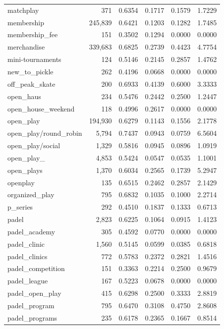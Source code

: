 \begin{table}[htbp]
\begin{tabular}{lrrrrr}
  matchplay & 371 & 0.6354 & 0.1717 & 0.1579 & 1.7229 \\
  membership & 245,839 & 0.6421 & 0.1203 & 0.1282 & 1.7485 \\
  membership\_fee & 151 & 0.3502 & 0.1294 & 0.0000 & 0.0000 \\
  merchandise & 339,683 & 0.6825 & 0.2739 & 0.4423 & 4.7754 \\
  mini-tournaments & 124 & 0.5146 & 0.2145 & 0.2857 & 1.4762 \\
  new\_to\_pickle & 262 & 0.4196 & 0.0668 & 0.0000 & 0.0000 \\
  off\_peak\_skate & 200 & 0.6933 & 0.4139 & 0.6000 & 3.3333 \\
  open\_haus & 234 & 0.5476 & 0.2442 & 0.2500 & 1.2447 \\
  open\_house\_weekend & 118 & 0.4996 & 0.2617 & 0.0000 & 0.0000 \\
  open\_play & 194,930 & 0.6279 & 0.1143 & 0.1556 & 2.1778 \\
  open\_play/round\_robin & 5,794 & 0.7437 & 0.0943 & 0.0759 & 6.5604 \\
  open\_play/social & 1,329 & 0.5816 & 0.0945 & 0.0896 & 1.0919 \\
  open\_play\_ & 4,853 & 0.5424 & 0.0547 & 0.0535 & 1.1001 \\
  open\_plays & 1,370 & 0.6034 & 0.2565 & 0.1739 & 5.2947 \\
  openplay & 135 & 0.6515 & 0.2462 & 0.2857 & 2.1429 \\
  organized\_play & 795 & 0.6832 & 0.1035 & 0.1000 & 2.2714 \\
  p\_series & 292 & 0.4510 & 0.1837 & 0.1333 & 0.6713 \\
  padel & 2,823 & 0.6225 & 0.1064 & 0.0915 & 1.4123 \\
  padel\_academy & 305 & 0.4592 & 0.0770 & 0.0000 & 0.0000 \\
  padel\_clinic & 1,560 & 0.5145 & 0.0599 & 0.0385 & 0.6818 \\
  padel\_clinics & 772 & 0.5783 & 0.2372 & 0.2821 & 1.4516 \\
  padel\_competition & 151 & 0.3363 & 0.2214 & 0.2500 & 0.9679 \\
  padel\_league & 167 & 0.5223 & 0.0678 & 0.0000 & 0.0000 \\
  padel\_open\_play & 415 & 0.6298 & 0.2500 & 0.3333 & 2.8819 \\
  padel\_program & 795 & 0.6470 & 0.3108 & 0.4750 & 2.8608 \\
  padel\_programs & 235 & 0.6178 & 0.2365 & 0.1667 & 0.8514 \\

\end{tabular}
\end{table}
